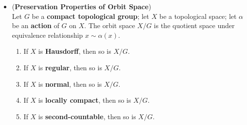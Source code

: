 \documentclass[11pt]{article}
\begin{document}
\begin{itemize}
\item \begin{theorem} (\textbf{Preservation Properties of Orbit Space}) \citep{munkres2000topology}\\
Let $G$ be a \textbf{compact topological group}; let $X$ be a topological space; let $\alpha$ be an \textbf{action} of $G$ on $X$. The orbit space $X/G$ is the quotient space under equivalence relationship $x \sim \alpha(x)$. 
\begin{enumerate}
\item If $X$ is \textbf{Hausdorff}, then so is $X/G$.
\item If $X$ is \textbf{regular}, then so is $X/G$.
\item If $X$ is \textbf{normal}, then so is $X/G$.
\item If $X$ is \textbf{locally compact}, then so is $X/G$.
\item If $X$ is \textbf{second-countable}, then so is $X/G$.
\end{enumerate}
\end{theorem}

\end{itemize}
\end{document}
